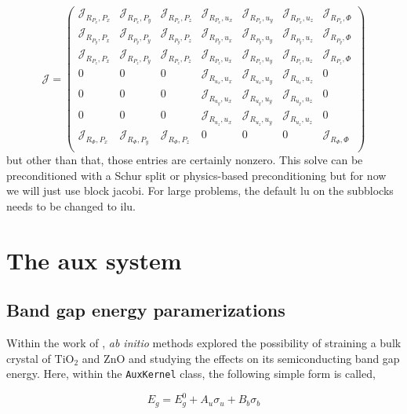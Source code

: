 \documentclass[16pt]{article} %
\begin{document}
$$ \mathscr{J}  = \begin{pmatrix}
\mathscr{J}_{R_{P_x}, P_x} &\mathscr{J}_{R_{P_x},P_y}&\mathscr{J}_{R_{P_x},P_z} &\mathscr{J}_{R_{P_x}, u_x}& \mathscr{J}_{R_{P_x},u_y} &\mathscr{J}_{R_{P_x},u_z} & \mathscr{J}_{R_{P_x},\Phi}\\
\mathscr{J}_{R_{P_y}, P_x} &\mathscr{J}_{R_{P_y},P_y}&\mathscr{J}_{R_{P_y},P_z} &\mathscr{J}_{R_{P_y}, u_x}& \mathscr{J}_{R_{P_y},u_y} &\mathscr{J}_{R_{P_y},u_z} & \mathscr{J}_{R_{P_y},\Phi}\\
\mathscr{J}_{R_{P_z}, P_x} &\mathscr{J}_{R_{P_z},P_y}&\mathscr{J}_{R_{P_z},P_z} &\mathscr{J}_{R_{P_z}, u_x}& \mathscr{J}_{R_{P_z},u_y} &\mathscr{J}_{R_{P_z},u_z} & \mathscr{J}_{R_{P_z},\Phi}\\
0&0&0 &\mathscr{J}_{R_{u_x}, u_x}& \mathscr{J}_{R_{u_x},u_y} &\mathscr{J}_{R_{u_x},u_z} & 0\\
0 &0&0 &\mathscr{J}_{R_{u_y}, u_x}& \mathscr{J}_{R_{u_y},u_y} &\mathscr{J}_{R_{u_y},u_z} & 0\\
0 &0&0&\mathscr{J}_{R_{u_z}, u_x}& \mathscr{J}_{R_{u_z},u_y} &\mathscr{J}_{R_{u_z},u_z} & 0\\
\mathscr{J}_{R_{\Phi}, P_x} &\mathscr{J}_{R_{\Phi},P_y}&\mathscr{J}_{R_{\Phi},P_z} & 0 & 0 & 0 & \mathscr{J}_{R_{\Phi},\Phi}\\
 \end{pmatrix} $$
\normalsize
but other than that, those entries are certainly nonzero. 
%
This solve can be preconditioned with a Schur split or physics-based preconditioning but for now we will just use block jacobi.
%
For large problems, the default lu on the subblocks needs to be changed to ilu.


\section{The aux system}

\subsection{Band gap energy paramerizations}

Within the work of \cite{Yin2010, Wagner2013}, \emph{ab initio} methods explored the possibility of straining a bulk crystal of $\mathrm{TiO}_2$ and $\mathrm{ZnO}$ and studying the effects on its semiconducting band gap energy. Here, within the \texttt{AuxKernel} class, the following simple form is called,

$$ E_g = E_g^0 + A_u \sigma_u + B_b \sigma_b$$
\end{document}
